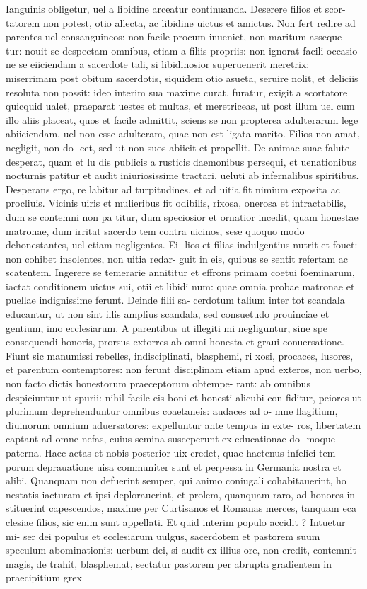 \documentclass{article}
\begin{document}
\begin{pages}
\marginpar{[ p.493 ]}\pstart Ianguinis obligetur, uel a libidine arceatur continuanda. Deserere filios et scor- tatorem non potest, otio allecta, ac libidine uictus et amictus. Non fert redire ad parentes uel consanguineos: non facile procum inueniet, non maritum asseque- tur: nouit se despectam omnibus, etiam a filiis propriis: non ignorat facili occasio ne se eiiciendam a sacerdote tali, si libidinosior superuenerit meretrix: miserrimam post obitum sacerdotis, siquidem otio asueta, seruire nolit, et deliciis resoluta non possit: ideo interim sua maxime curat, furatur, exigit a scortatore quicquid ualet, praeparat uestes et multas, et meretriceas, ut post illum uel cum illo aliis placeat, quos et facile admittit, sciens se non propterea adulterarum lege abiiciendam, uel non esse adulteram, quae non est ligata marito. Filios non amat, negligit, non do- cet, sed ut non suos abiicit et propellit. De animae suae falute desperat, quam et lu dis publicis a rusticis daemonibus persequi, et uenationibus nocturnis patitur et audit iniuriosissime tractari, ueluti ab infernalibus spiritibus. Desperans ergo, re labitur ad turpitudines, et ad uitia fit nimium exposita ac procliuis. Vicinis uiris et mulieribus fit odibilis, rixosa, onerosa et intractabilis, dum se contemni non pa titur, dum speciosior et ornatior incedit, quam honestae matronae, dum irritat sacerdo tem contra uicinos, sese quoquo modo dehonestantes, uel etiam negligentes. Ei- lios et filias indulgentius nutrit et fouet: non cohibet insolentes, non uitia redar- guit in eis, quibus se sentit refertam ac scatentem. Ingerere se temerarie annititur et effrons primam coetui foeminarum, iactat conditionem uictus sui, otii et libidi num: quae omnia probae matronae et puellae indignissime ferunt. Deinde filii sa- cerdotum talium inter tot scandala educantur, ut non sint illis amplius scandala, sed consuetudo prouinciae et gentium, imo ecclesiarum. A parentibus ut illegiti mi negliguntur, sine spe consequendi honoris, prorsus extorres ab omni honesta et graui conuersatione. Fiunt sic manumissi rebelles, indisciplinati, blasphemi, ri xosi, procaces, lusores, et parentum contemptores: non ferunt disciplinam etiam apud exteros, non uerbo, non facto dictis honestorum praeceptorum obtempe- rant: ab omnibus despiciuntur ut spurii: nihil facile eis boni et honesti alicubi con fiditur, peiores ut plurimum deprehenduntur omnibus coaetaneis: audaces ad o- mne flagitium, diuinorum omnium aduersatores: expelluntur ante tempus in exte- ros, libertatem captant ad omne nefas, cuius semina susceperunt ex educationae do- moque paterna. Haec aetas et nobis posterior uix credet, quae hactenus infelici tem porum deprauatione uisa communiter sunt et perpessa in Germania nostra et alibi. Quanquam non defuerint semper, qui animo coniugali cohabitauerint, ho nestatis iacturam et ipsi deplorauerint, et prolem, quanquam raro, ad honores in- stituerint capescendos, maxime per Curtisanos et Romanas merces, tanquam eca clesiae filios, sic enim sunt appellati. Et quid interim populo accidit ? Intuetur mi- ser dei populus et ecclesiarum uulgus, sacerdotem et pastorem suum speculum abominationis: uerbum dei, si audit ex illius ore, non credit, contemnit magis, de trahit, blasphemat, sectatur pastorem per abrupta gradientem in praecipitium grex 
\end{pages}
\end{document}
